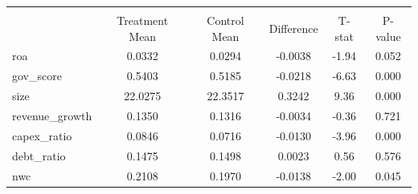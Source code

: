 {
\def\sym#1{\ifmmode^{#1}\else\(^{#1}\)\fi}
\begin{tabular}{l*{1}{ccccc}}
\hline\hline
                    &\multicolumn{5}{c}{}                                            \\
                    &Treatment Mean&Control Mean&  Difference&      T-stat&     P-value\\
\hline
roa                 &      0.0332&      0.0294&     -0.0038&       -1.94&       0.052\\
gov\_score           &      0.5403&      0.5185&     -0.0218&       -6.63&       0.000\\
size                &     22.0275&     22.3517&      0.3242&        9.36&       0.000\\
revenue\_growth      &      0.1350&      0.1316&     -0.0034&       -0.36&       0.721\\
capex\_ratio         &      0.0846&      0.0716&     -0.0130&       -3.96&       0.000\\
debt\_ratio          &      0.1475&      0.1498&      0.0023&        0.56&       0.576\\
nwc                 &      0.2108&      0.1970&     -0.0138&       -2.00&       0.045\\
\hline\hline
\end{tabular}
}
